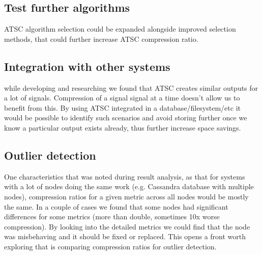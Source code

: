 \documentclass[conference]{IEEEtran}
\begin{document}

\subsection*{Test further algorithms}

ATSC algorithm selection could be expanded alongside improved selection methods, that could further increase ATSC compression ratio.


\subsection{Integration with other systems}

while developing and researching we found that ATSC creates similar outputs for a lot of signals. Compression of a signal signal at a time doesn't allow us to benefit from this. By using ATSC integrated in a database/filesystem/etc it would be possible
to identify such scenarios and avoid storing further once we know a particular output exists already, thus further increase space savings.


\subsection{Outlier detection}

One characteristics that was noted during result analysis, as that for systems with a lot of nodes doing the same work (e.g. Cassandra database with multiple nodes), compression ratios for a given metric across all nodes would be mostly the same.
In a couple of cases we found that some nodes had significant differences for some metrics (more than double, sometimes 10x worse compression). By looking into the detailed metrics we could find that the node was misbehaving and it should be fixed 
or replaced. This opens a front worth exploring that is comparing compression ratios for outlier detection.
\end{document}
